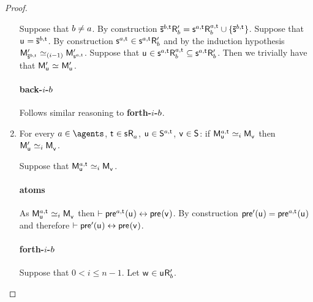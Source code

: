 \begin{proof}
\begin{enumerate}
        Suppose that $b \neq a$.
        By construction $\aPStateS[\agentB,\aStateT] \aAccessibility[\prime]{\agentB} = \aStateS[\agentA,\aStateT] \aAccessibility[\agentA,\aStateT]{\agentB} \cup \{\aPStateS[\agentB,\aStateT]\}$. 
        Suppose that $\aStateU = \aPStateS[\agentB,\aStateT]$.
        By construction $\aStateS[\agentA,\aStateT] \in \aStateS[\agentA,\aStateT] \aAccessibility[\prime]{\agentB}$ and by the induction hypothesis $\aPModel[\prime]{\aPStateS[\agentB,\aStateT]} \bisimilar[(i - 1)] \aPModel[\prime]{\aStateS[\agentA,\aStateT]}$.
        Suppose that $\aStateU \in \aStateS[\agentA,\aStateT] \aAccessibility[\agentA,\aStateT]{\agentB} \subseteq \aStateS[\agentA,\aStateT] \aAccessibility[\prime]{\agentB}$.
        Then we trivially have that $\aPModel[\prime]{\aStateU} \bisimilar \aPModel[\prime]{\aStateU}$.

        \paragraph{back-$i$-$b$} Follows similar reasoning to {\bf forth-$i$-$b$}.

    \item 
        For every $\agentA \in \agents$, $\aStateT \in \aStateS \aAccessibility{\agentA}$, $\aStateU \in \aStates[\agentA,\aStateT]$, $\aStateV \in \aStates$: if $\aPModel[\agentA,\aStateT]{\aStateU} \bisimilar[i] \aPModel{\aStateV}$ then $\aPModel[\prime]{\aStateU} \bisimilar[i] \aPModel{\aStateV}$.

        Suppose that $\aPModel[\agentA,\aStateT]{\aStateU} \bisimilar[i] \aPModel{\aStateV}$. 

        \paragraph{atoms}

        As $\aPModel[\agentA,\aStateT]{\aStateU} \bisimilar[i] \aPModel{\aStateV}$ then $\proves \aPrecondition[\agentA,\aStateT](\aStateU) \iff \aPrecondition(\aStateV)$. 
        By construction $\aPrecondition[\prime](\aStateU) = \aPrecondition[\agentA,\aStateT](\aStateU)$ and therefore $\proves \aPrecondition[\prime](\aStateU) \iff \aPrecondition(\aStateV)$.

        \paragraph{forth-$i$-$b$}

        Suppose that $0 < i \leq n - 1$.
        Let $\aStateW \in \aStateU \aAccessibility[\prime]{\agentB}$.


\end{enumerate}
\end{proof}
